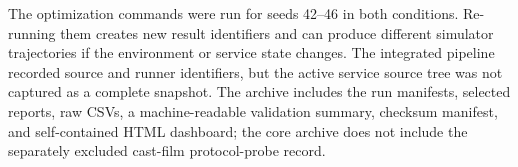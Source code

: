 \documentclass[10pt]{article}
\begin{document}
The optimization commands were run for seeds 42--46 in both conditions. Re-running them creates new result identifiers and can produce different simulator trajectories if the environment or service state changes. The integrated pipeline recorded source and runner identifiers, but the active service source tree was not captured as a complete snapshot. The archive includes the run manifests, selected reports, raw CSVs, a machine-readable validation summary, checksum manifest, and self-contained HTML dashboard; the core archive does not include the separately excluded cast-film protocol-probe record.

\small


\end{document}
